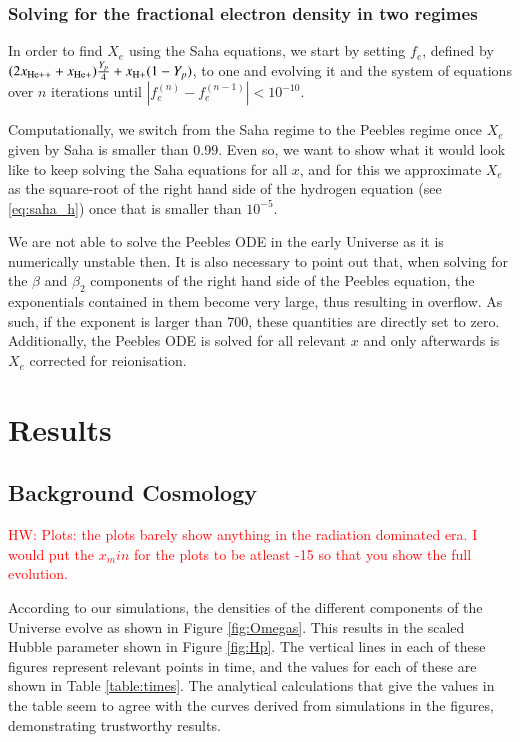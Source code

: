 \documentclass{aa}
\newcommand{\hw}[1]{\textcolor{red}{HW: #1}}
\begin{document}
\subsubsection{Solving for the fractional electron density in two regimes}

In order to find $X_e$ using the Saha equations, we start by setting $f_e$, defined by $(2x_{\rm He++} + x_{\rm He+})\frac{Y_p}{4} + x_{\rm H+}(1-Y_p)$, to one and evolving it and the system of equations over $n$ iterations until $|f_e^{(n)} - f_e^{(n-1)}| < 10^{-10}$.

Computationally, we switch from the Saha regime to the Peebles regime once $X_e$ given by Saha is smaller than 0.99. Even so, we want to show what it would look like to keep solving the Saha equations for all $x$, and for this we approximate $X_e$ as the square-root of the right hand side of the hydrogen equation (see \eqref{eq:saha_h}) once that is smaller than $10^{-5}$.

We are not able to solve the Peebles ODE in the early Universe as it is numerically unstable then. It is also necessary to point out that, when solving for the $\beta$ and $\beta_2$ components of the right hand side of the Peebles equation, the exponentials contained in them become very large, thus resulting in overflow. As such, if the exponent is larger than 700, these quantities are directly set to zero. Additionally, the Peebles ODE is solved for all relevant $x$ and only afterwards is $X_e$ corrected for reionisation.

\section{Results}

\subsection{Background Cosmology}

\hw{Plots: the plots barely show anything in the radiation dominated era. I would put the $x_min$ for the plots to be atleast -15 so that you show the full evolution.}

According to our simulations, the densities of the different components of the Universe evolve as shown in Figure \ref{fig:Omegas}. This results in the scaled Hubble parameter shown in Figure \ref{fig:Hp}. The vertical lines in each of these figures represent relevant points in time, and the values for each of these are shown in Table \ref{table:times}. The analytical calculations that give the values in the table seem to agree with the curves derived from simulations in the figures, demonstrating trustworthy results.
\end{document}
